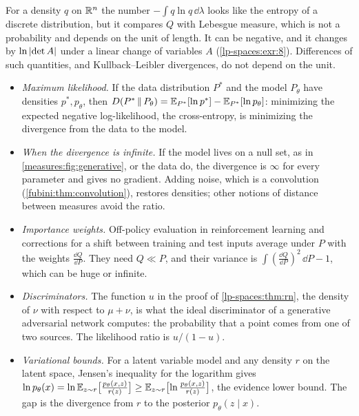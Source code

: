 \begin{notechapter}
\begin{pitfall}
For a density $q$ on $\mathbb{R}^n$ the number $-\int q\ln q\,\dd\lambda$ looks
like the entropy of a discrete distribution, but it compares $Q$ with
Lebesgue measure, which is not a probability and depends on the unit of
length. It can be negative, and it changes by $\ln\left|\det A\right|$ under a
linear change of variables $A$ (\cref{lp-spaces:exr:8}). Differences of
such quantities, and Kullback--Leibler divergences, do not depend on the
unit.
\end{pitfall}

\begin{mlthread}
\begin{itemize}[nosep]
  \item \emph{Maximum likelihood.} If the data distribution $P^\ast$ and
        the model $P_\theta$ have densities $p^\ast, p_\theta$, then
        $D(P^\ast\,\|\,P_\theta)
        = \mathbb{E}_{P^\ast}[\ln p^\ast] - \mathbb{E}_{P^\ast}[\ln p_\theta]$:
        minimizing the expected negative log-likelihood, the
        cross-entropy, is minimizing the divergence from the data to the
        model.
  \item \emph{When the divergence is infinite.} If the model lives on a
        null set, as in \cref{measures:fig:generative}, or the data do,
        the divergence is $\infty$ for every parameter and gives no
        gradient. Adding noise, which is a convolution
        (\cref{fubini:thm:convolution}), restores densities; other
        notions of distance between measures avoid the ratio.
  \item \emph{Importance weights.} Off-policy evaluation in
        reinforcement learning and corrections for a shift between
        training and test inputs average under $P$ with the weights
        $\frac{\dd Q}{\dd P}$. They need $Q\ll P$, and their variance is
        $\int(\frac{\dd Q}{\dd P})^2\,\dd P - 1$, which can be huge or
        infinite.
  \item \emph{Discriminators.} The function $u$ in the proof of
        \cref{lp-spaces:thm:rn}, the density of $\nu$ with respect to
        $\mu + \nu$, is what the ideal discriminator of a generative
        adversarial network computes: the probability that a point
        comes from one of two sources. The likelihood ratio is
        $u/(1 - u)$.
  \item \emph{Variational bounds.} For a latent variable model and any
        density $r$ on the latent space, Jensen's inequality for the
        logarithm gives
        $\ln p_\theta(x)
        = \ln\mathbb{E}_{z\sim r}\bigl[\frac{p_\theta(x, z)}{r(z)}\bigr]
        \geq\mathbb{E}_{z\sim r}\bigl[\ln\frac{p_\theta(x, z)}{r(z)}\bigr]$,
        the evidence lower bound. The gap is the divergence from $r$ to
        the posterior $p_\theta(z\mid x)$.
\end{itemize}
\end{mlthread}


\end{notechapter}
